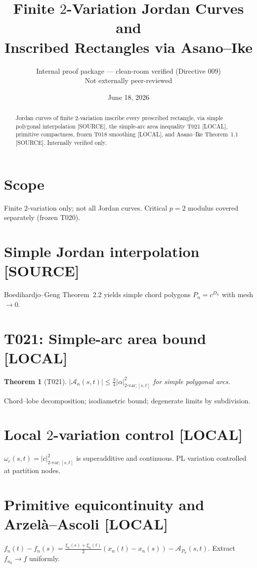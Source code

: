 \documentclass[11pt]{article}
\title{Finite $2$-Variation Jordan Curves and\\ Inscribed Rectangles via Asano--Ike}
\author{Internal proof package --- clean-room verified (Directive 009)\\Not externally peer-reviewed}
\date{June 18, 2026}
\newtheorem{theorem}{Theorem}[section]
\theoremstyle{definition}
\theoremstyle{remark}
\newcommand{\tagsource}{\textsf{\footnotesize[SOURCE]}}
\newcommand{\taglocal}{\textsf{\footnotesize[LOCAL]}}
\begin{document}
\maketitle

\begin{abstract}
Jordan curves of finite $2$-variation inscribe every prescribed rectangle,
via simple polygonal interpolation \tagsource, the simple-arc area inequality
T021 \taglocal, primitive compactness, frozen T018 smoothing \taglocal,
and Asano--Ike Theorem~1.1 \tagsource. Internally verified only.
\end{abstract}

\section{Scope}
Finite $2$-variation only; not all Jordan curves. Critical $p=2$ modulus covered separately (frozen T020).

\section{Simple Jordan interpolation \tagsource}
Boedihardjo--Geng Theorem~2.2 yields simple chord polygons $P_n=c^{D_n}$ with mesh $\to0$.

\section{T021: Simple-arc area bound \taglocal}
\begin{theorem}[T021]
$|\mathcal A_\alpha(s,t)|\le\frac{\pi}{4}|\alpha|_{2\text{-var};[s,t]}^2$ for simple polygonal arcs.
\end{theorem}
Chord--lobe decomposition; isodiametric bound; degenerate limits by subdivision.

\section{Local $2$-variation control \taglocal}
$\omega_c(s,t)=|c|_{2\text{-var};[s,t]}^2$ is superadditive and continuous. PL variation controlled at partition nodes.

\section{Primitive equicontinuity and Arzel\`a--Ascoli \taglocal}
$f_n(t)-f_n(s)=\frac{\xi_n(s)+\xi_n(t)}{2}(x_n(t)-x_n(s))-\mathcal A_{P_n}(s,t)$. Extract $f_{n_k}\to f$ uniformly.
\end{document}
